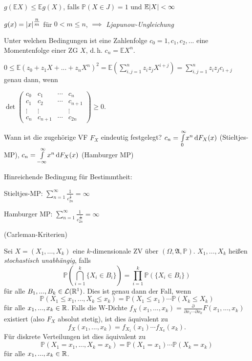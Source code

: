 \documentclass{cheat-sheet}
\newcommand{\Alg}{\mathfrak{A}} %
\renewcommand{\P}{\mathbb{P}} %
\newcommand{\E}{\mathbb{E}} %
\begin{document}
\begin{satz}
  $g(\E X) \leq \E g(X)$, falls $\P(X \in J) = 1$ und $\E \abs{X} < \infty$
\end{satz}


$g(x) = \lvert x\rvert^{\tfrac{n}{m}}$ für $0 < m \leq n$, $\implies$ \emph{Ljapunow-Ungleichung}

\begin{problem}[Momentenproblem]
  Unter welchen Bedingungen ist eine Zahlenfolge $c_0 = 1, c_1, c_2, ...$ eine Momentenfolge einer ZG $X$, d.\,h. $c_n = \E X^n$.
\end{problem}

\begin{antwort}
  $0 \leq \E(z_0 + z_1 X + ... + z_n X^n)^2 = \E(\sum_{i,j=1}^n z_i z_j X^{i+j}) = \sum_{i,j=1}^n z_i z_j c_{i+j}$ genau dann, wenn

  $\det \begin{pmatrix} c_0 & c_1 & \cdots & c_n \\ c_1 & c_2 & \cdots & c_{n+1} \\ \vdots & \vdots & & \vdots \\ c_n & c_{n+1} & \cdots & c_{2n} \end{pmatrix} \geq 0$.
\end{antwort}

\begin{problem}
  Wann ist die zugehörige VF $F_X$ eindeutig festgelegt? $c_n = {\textstyle \int\limits_{0}^{\infty}} x^n \,\mathrm{d} F_X(x)$ (Stieltjes-MP), $c_n = {\textstyle \int\limits_{-\infty}^{\infty}} x^n \,\mathrm{d} F_X(x)$ (Hamburger MP)

  Hinreichende Bedingung für Bestimmtheit:

  Stieltjes-MP: $\sum_{n=1}^\infty \frac{1}{c_{2n}^{\tfrac{1}{n}}} = \infty$

  Hamburger MP: $\sum_{n=1}^\infty \frac{1}{c_{2n}^{\tfrac{1}{2n}}} = \infty$

  (Carleman-Kriterien)
\end{problem}




\begin{defn}
  Sei $X = (X_1, ..., X_k)$ eine $k$-dimensionale ZV über $(\Omega, \Alg, \P)$. $X_1, ..., X_k$ heißen \emph{stochastisch unabhängig}, falls
  \[ \P(\bigcap_{i=1}^k \{ X_i \in B_i \}) = \prod_{i=1}^k \P(\{ X_i \in B_i \}) \]
  für alle $B_1, ..., B_k \in \mathcal{L}(\mathbb{R}^1)$. Dies ist genau dann der Fall, wenn
  \[ \P(X_1 \leq x_1, ..., X_k \leq x_k) = \P(X_1 \leq x_1) \cdots \P(X_k \leq X_k) \]
  für alle $x_1, ..., x_k \in \mathbb{R}$. Falls die W-Dichte $f_X(x_1, ..., x_k) = \tfrac{\partial}{\partial x_1 \cdots \partial x_k} F(x_1, ..., x_k)$ existiert (also $F_X$ absolut stetig), ist dies äquivalent zu
  \[ f_X(x_1, ..., x_k) = f_{X_1}(x_1) \cdots f_{X_k}(x_k). \]
  Für diskrete Verteilungen ist dies äquivalent zu
  \[ \P(X_1 = x_1, ..., X_k = x_k) = \P(X_1 = x_1) \cdots \P(X_k = x_k) \]
  für alle $x_1, ..., x_k \in \mathbb{R}$.
\end{defn}
\end{document}
